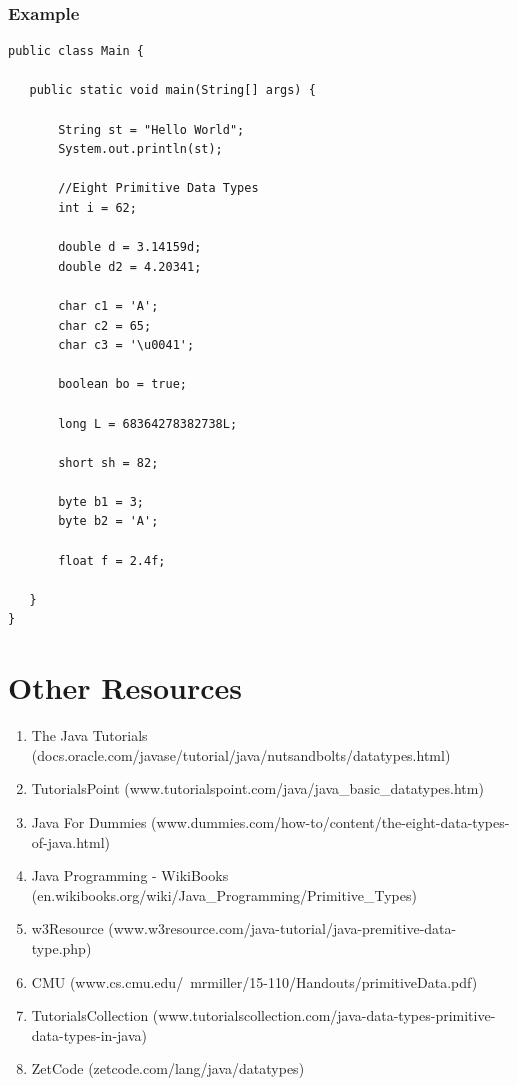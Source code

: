\documentclass[a4paper]{article}
\begin{document}
\subsubsection*{Example}
\begin{lstlisting}
public class Main {

   public static void main(String[] args) {

       String st = "Hello World";
       System.out.println(st);

       //Eight Primitive Data Types
       int i = 62;

       double d = 3.14159d;
       double d2 = 4.20341;

       char c1 = 'A';
       char c2 = 65;
       char c3 = '\u0041';

       boolean bo = true;

       long L = 68364278382738L;

       short sh = 82;

       byte b1 = 3;
       byte b2 = 'A';

       float f = 2.4f;

   }
}
\end{lstlisting}

\newpage

\section*{Other Resources}
\begin{enumerate}
\item The Java Tutorials (docs.oracle.com/javase/tutorial/java/nutsandbolts/datatypes.html)
\item TutorialsPoint (www.tutorialspoint.com/java/java\_basic\_datatypes.htm)
\item Java For Dummies (www.dummies.com/how-to/content/the-eight-data-types-of-java.html)
\item Java Programming - WikiBooks (en.wikibooks.org/wiki/Java\_Programming/Primitive\_Types)
\item w3Resource (www.w3resource.com/java-tutorial/java-premitive-data-type.php)
\item CMU (www.cs.cmu.edu/~mrmiller/15-110/Handouts/primitiveData.pdf)
\item TutorialsCollection (www.tutorialscollection.com/java-data-types-primitive-data-types-in-java)
\item ZetCode (zetcode.com/lang/java/datatypes)
\end{enumerate}
\end{document}
